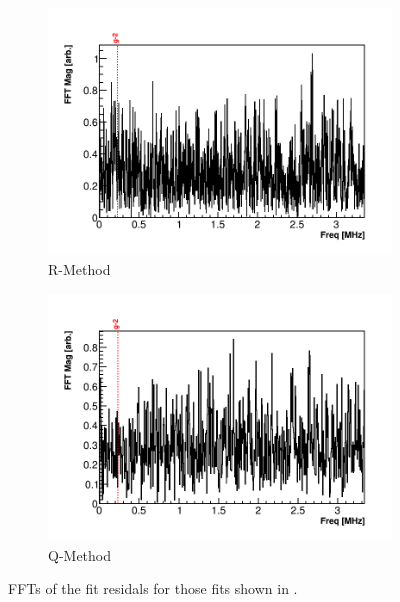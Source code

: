 \begin{figure}[]
    \begin{subfigure}[t]{0.45\textwidth}
        \centering
        \includegraphics[width=\textwidth]{FFT_RMethod}
        \caption{R-Method}
    \end{subfigure}
    \hspace{1mm}
    \begin{subfigure}[t]{0.45\textwidth}
        \centering
        \includegraphics[width=\textwidth]{FFT_QMethod}
        \caption{Q-Method}
    \end{subfigure}
\caption[]{FFTs of the fit residals for those fits shown in .}
\label{fig:FFTs}
\end{figure}


